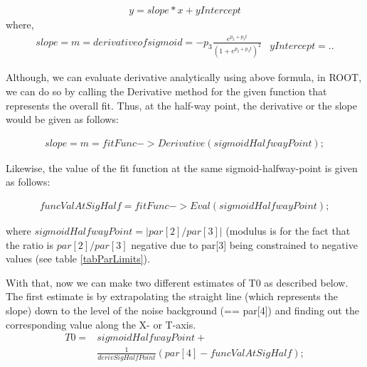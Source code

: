 \documentclass[12pt,epsfig]{article}
\begin{document}
\begin{eqnarray}
  \label{sigmEdge}
  y = slope*x + yIntercept 
\end{eqnarray}
where,
\begin{subequations}
\label{sig_mc}
\begin{eqnarray}
\label{sig_m}
slope = m = derivative of sigmoid = - p_3 \frac{e^{p_2 + p_3t}}{(1 + e^{p_2 + p_3t})^2} 
\end{eqnarray}

\begin{eqnarray}
\label{sig_c}
yIntercept  = ..
\end{eqnarray}
\end{subequations}

Although, we can evaluate  derivative analytically using above formula, in ROOT, we can do so by calling 
the Derivative method for the given function that represents the overall fit. Thus, at the half-way point, the 
derivative or the slope would be given as follows:

\begin{eqnarray}
\label{fSlopeAt1By2}
slope = m = fitFunc->Derivative(sigmoidHalfwayPoint);
\end{eqnarray}

Likewise, the value of the fit function at the same sigmoid-halfway-point is given as follows:

\begin{eqnarray}
\label{fValAt1By2}
funcValAtSigHalf = fitFunc->Eval(sigmoidHalfwayPoint);
\end{eqnarray}

where $sigmoidHalfwayPoint = |par[2]/par[3]|$ (modulus is for the fact that the ratio is 
$par[2]/par[3]$ negative due to par[3] being constrained to negative values (see 
table \ref{tabParLimits}).



With that, now we can make two different estimates of T0 as described below. The first estimate
is by extrapolating the straight line (which represents the slope) down to the level of the noise background (== par[4]) 
and finding out the corresponding value along the X- or T-axis.
\begin{equation}
\label{T0estm1}
\begin{aligned}
   T0   = & sigmoidHalfwayPoint + \\
          & \frac{1}{derivSigHalfPoint} (par[4] - funcValAtSigHalf); 
\end{aligned}
\end{equation}
\end{document}
